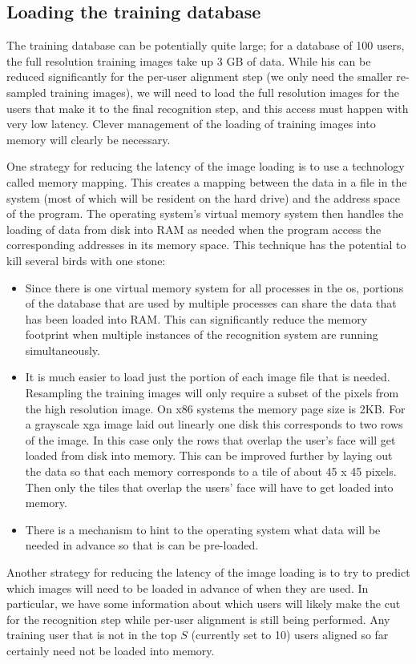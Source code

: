 \subsection{Loading the training database}  The training database can be
potentially quite large; for a database of 100 users, the full resolution
training images take up 3 GB of data.  While his can be reduced significantly
for the per-user alignment step (we only need the smaller re-sampled training
images), we will need to load the full resolution images for the users that
make it to the final recognition step, and this access must happen with very
low latency.  Clever management of the loading of training images into memory
will clearly be necessary.

One strategy for reducing the latency of the image loading is to use a
technology called memory mapping.  This creates a mapping between the data in a
file in the system (most of which will be resident on the hard drive) and the
address space of the program.  The operating system's virtual memory system
then handles the loading of data from disk into RAM as needed when the program
access the corresponding addresses in its memory space.  This technique has the
potential to kill several birds with one stone:
\begin{itemize}
\item Since there is one virtual memory system for all processes in the os,
portions of the database that are used by multiple processes can share the data
that has been loaded into RAM.  This can significantly reduce the memory
footprint when multiple instances of the recognition system are running
simultaneously.
\item It is much easier to load just the portion of each image file that is
needed.  Resampling the training images will only require a subset of the
pixels from the high resolution image.  On x86 systems the memory page size is
2KB.  For a grayscale xga image laid out linearly one disk this corresponds to
two rows of the image.  In this case only the rows that overlap the user's face
will get loaded from disk into memory.  This can be improved further by laying
out the data so that each memory corresponds to a tile of about 45 x 45 pixels.
Then only the tiles that overlap the users' face will have to get loaded into
memory.
\item There is a mechanism to hint to the operating system what data will be
needed in advance so that is can be pre-loaded.  
\end{itemize} 
Another strategy for reducing the latency of the image loading is to try to
predict which images will need to be loaded in advance of when they are used.
In particular, we have some information about which users will likely make the
cut for the recognition step while per-user alignment is still being performed.
Any training user that is not in the top $S$ (currently set to 10) users
aligned so far certainly need not be loaded into memory.  

